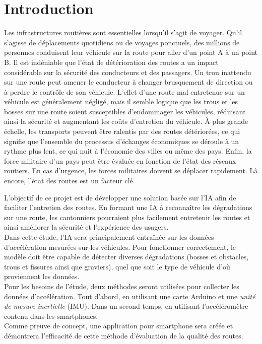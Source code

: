 \section{Introduction}
Les infrastructures routières sont essentielles lorsqu'il s'agit de voyager. Qu'il s'agisse de déplacements quotidiens ou de voyages ponctuels, des millions de personnes conduisent leur véhicule sur la route pour aller d'un point A à un point B. Il est indéniable que l'état de détérioration des routes a un impact considérable sur la sécurité des conducteurs et des passagers. Un trou inattendu sur une route peut amener le conducteur à changer brusquement de direction ou à perdre le contrôle de son véhicule. L'effet d'une route mal entretenue sur un véhicule est généralement négligé, mais il semble logique que les trous et les bosses sur une route soient susceptibles d'endommager les véhicules, réduisant ainsi la sécurité et augmentant les coûts d'entretien du véhicule. À plus grande échelle, les transports peuvent être ralentis par des routes détériorées, ce qui signifie que l'ensemble du processus d'échanges économiques se déroule à un rythme plus lent, ce qui nuit à l'économie des villes ou même des pays. Enfin, la force militaire d'un pays peut être évaluée en fonction de l'état des réseaux routiers. En cas d'urgence, les forces militaires doivent se déplacer rapidement. Là encore, l'état des routes est un facteur clé.

L'objectif de ce projet est de développer une solution basée sur l'IA afin de faciliter l'entretien des routes. En formant une IA à reconnaître les dégradations sur une route, les cantonniers pourraient plus facilement entretenir les routes et ainsi améliorer la sécurité et l'expérience des usagers.\\
Dans cette étude, l'IA sera principalement entraînée sur les données d'accélération mesurées sur les véhicules. Pour fonctionner correctement, le modèle doit être capable de détecter diverses dégradations (bosses et obstacles, trous et fissures ainsi que graviers), quel que soit le type de véhicule d'où proviennent les données.\\
Pour les besoins de l'étude, deux méthodes seront utilisées pour collecter les données d'accélération. Tout d'abord, en utilisant une carte Arduino et une \textit{unité de mesure inertielle} (IMU). Dans un second temps, en utilisant l'accéléromètre contenu dans les smartphones.\\
Comme preuve de concept, une application pour smartphone sera créée et démontrera l'efficacité de cette méthode d'évaluation de la qualité des routes.